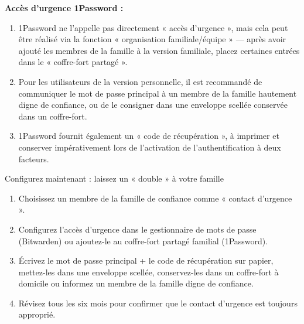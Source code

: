 \textbf{Accès d'urgence 1Password :}

\begin{enumerate}
  \item 1Password ne l'appelle pas directement « accès d'urgence », mais cela peut être réalisé via la fonction « organisation familiale/équipe » — après avoir ajouté les membres de la famille à la version familiale, placez certaines entrées dans le « coffre-fort partagé ».
  \item Pour les utilisateurs de la version personnelle, il est recommandé de communiquer le mot de passe principal à un membre de la famille hautement digne de confiance, ou de le consigner dans une enveloppe scellée conservée dans un coffre-fort.
  \item 1Password fournit également un « code de récupération », à imprimer et conserver impérativement lors de l'activation de l'authentification à deux facteurs.
\end{enumerate}

\begin{tcbpractice}{Configurez maintenant : laissez un « double » à votre famille}
\begin{enumerate}
  \item Choisissez un membre de la famille de confiance comme « contact d'urgence ».
  \item Configurez l'accès d'urgence dans le gestionnaire de mots de passe (Bitwarden) ou ajoutez-le au coffre-fort partagé familial (1Password).
  \item Écrivez le mot de passe principal + le code de récupération sur papier, mettez-les dans une enveloppe scellée, conservez-les dans un coffre-fort à domicile ou informez un membre de la famille digne de confiance.
  \item Révisez tous les six mois pour confirmer que le contact d'urgence est toujours approprié.
\end{enumerate}

\end{tcbpractice}


